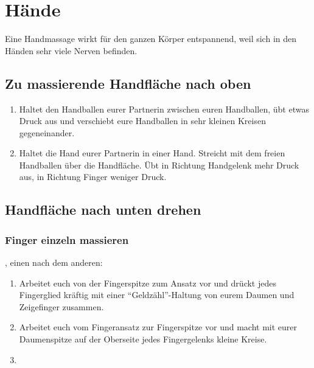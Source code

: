 \section{Hände}

Eine Handmassage wirkt für den ganzen Körper entspannend, weil sich in den Händen sehr viele Nerven befinden.

\subsection{Zu massierende Handfläche nach oben}
\begin{enumerate}
	\item {} Haltet den Handballen eurer Partnerin zwischen euren Handballen, übt etwas Druck aus und verschiebt eure Handballen in sehr kleinen Kreisen gegeneinander.
	\item {} Haltet die Hand eurer Partnerin in einer Hand. Streicht mit dem freien Handballen über die Handfläche. Übt in Richtung Handgelenk mehr Druck aus, in Richtung Finger weniger Druck.
\end{enumerate}


\subsection{Handfläche nach unten drehen}

\subsubsection{Finger einzeln massieren}

, einen nach dem anderen:

\begin{shaded}
	\begin{enumerate}
		\item {} Arbeitet euch von der Fingerspitze zum Ansatz vor und drückt jedes Fingerglied kräftig mit einer "`Geldzähl"'-Haltung von eurem Daumen und Zeigefinger zusammen.
		\item {} Arbeitet euch vom Fingeransatz zur Fingerspitze vor und macht mit eurer Daumenspitze auf der Oberseite jedes Fingergelenks kleine Kreise.
		\item {}
	\end{enumerate}
\end{shaded}

